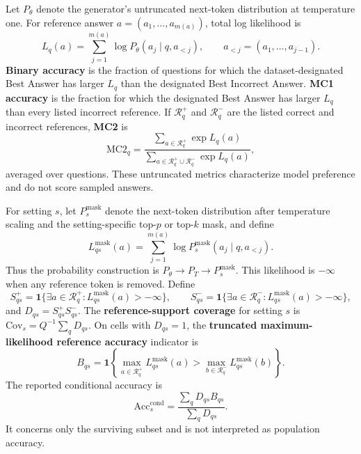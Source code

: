 \documentclass[11pt]{article}
\begin{document}
Let $P_\theta$ denote the generator's untruncated next-token distribution at
temperature one. For reference answer $a=(a_1,\ldots,a_{m(a)})$, total log
likelihood is
\[
 L_q(a)=\sum_{j=1}^{m(a)}\log P_\theta(a_j\mid q,a_{<j}),
 \qquad a_{<j}=(a_1,\ldots,a_{j-1}).
\]
\textbf{Binary accuracy} is the
fraction of questions for which the dataset-designated Best Answer has larger
$L_q$ than the designated Best Incorrect Answer. \textbf{MC1 accuracy} is the
fraction for which the designated Best Answer has larger $L_q$ than every listed
incorrect reference. If $\mathcal R_q^+$ and $\mathcal R_q^-$ are the listed
correct and incorrect references, \textbf{MC2} is
\[
 \mathrm{MC2}_q=
 \frac{\sum_{a\in\mathcal R_q^+}\exp L_q(a)}
 {\sum_{a\in\mathcal R_q^+\cup\mathcal R_q^-}\exp L_q(a)},
\]
averaged over questions. These untruncated metrics characterize model
preference and do not score sampled answers.

For setting $s$, let $P_s^{\mathrm{mask}}$ denote the next-token distribution
after temperature scaling and the setting-specific top-$p$ or top-$k$ mask,
and define
\[
 L^{\mathrm{mask}}_{qs}(a)=\sum_{j=1}^{m(a)}
 \log P_s^{\mathrm{mask}}(a_j\mid q,a_{<j}).
\]
Thus the probability construction is $P_\theta\rightarrow P_T\rightarrow
P_s^{\mathrm{mask}}$. This likelihood is $-\infty$ when any reference token is
removed. Define
\[
 S^+_{qs}=\mathbf 1\{\exists a\in\mathcal R_q^+:
 L^{\mathrm{mask}}_{qs}(a)>-\infty\},\qquad
 S^-_{qs}=\mathbf 1\{\exists a\in\mathcal R_q^-:
 L^{\mathrm{mask}}_{qs}(a)>-\infty\},
\]
and $D_{qs}=S^+_{qs}S^-_{qs}$. The \textbf{reference-support coverage} for
setting $s$ is $\mathrm{Cov}_s=Q^{-1}\sum_qD_{qs}$. On cells with $D_{qs}=1$,
the \textbf{truncated maximum-likelihood reference accuracy} indicator is
\[
 B_{qs}=\mathbf 1\left\{
 \max_{a\in\mathcal R_q^+}L^{\mathrm{mask}}_{qs}(a)
 >\max_{b\in\mathcal R_q^-}L^{\mathrm{mask}}_{qs}(b)
 \right\}.
\]
The reported
conditional accuracy is
\[
 \mathrm{Acc}^{\mathrm{cond}}_s=
 \frac{\sum_qD_{qs}B_{qs}}{\sum_qD_{qs}}.
\]
It concerns only the surviving subset and is not interpreted as population
accuracy.
\end{document}

